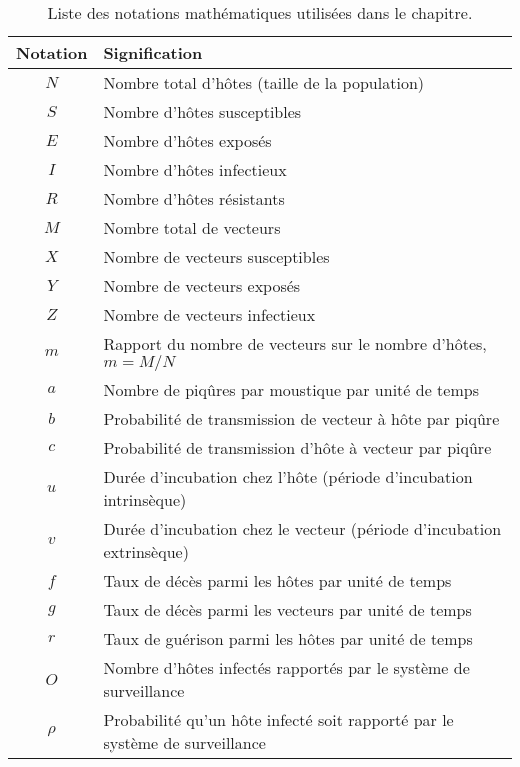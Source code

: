 \begin{table}[t]
\centering
\caption{Liste des notations mathématiques utilisées dans le chapitre. \vspace{.5em}}
\label{table:sign}
\begin{tabular}{cl}
\hline 
Notation & Signification \\ 
\hline
$N$ &	Nombre total d’hôtes (taille de la population) \\
$S$ &	Nombre d’hôtes susceptibles \\
$E$ &	Nombre d’hôtes exposés \\
$I$ &	Nombre d’hôtes infectieux \\
$R$ &	Nombre d’hôtes résistants \\
$M$ &	Nombre total de vecteurs \\
$X$ &	Nombre de vecteurs susceptibles \\
$Y$ &	Nombre de vecteurs exposés \\
$Z$ &	Nombre de vecteurs infectieux \\
$m$ &	Rapport du nombre de vecteurs sur le nombre d’hôtes, $m=M/N$ \\
$a$ &	Nombre de piqûres par moustique par unité de temps \\
$b$ &	Probabilité de transmission de vecteur à hôte par piqûre \\
$c$ &	Probabilité de transmission d’hôte à vecteur par piqûre \\
$u$ &	Durée d’incubation chez l’hôte (période d’incubation intrinsèque) \\
$v$ &	Durée d’incubation chez le vecteur (période d’incubation extrinsèque) \\
$f$ &	Taux de décès parmi les hôtes par unité de temps \\
$g$ &	Taux de décès parmi les vecteurs par unité de temps \\
$r$ &	Taux de guérison parmi les hôtes par unité de temps \\
$O$ & 	Nombre d’hôtes infectés rapportés par le système de surveillance \\
$\rho$ &	Probabilité qu'un hôte infecté soit rapporté par le système de surveillance \\
\hline 
\end{tabular} 
\end{table}

